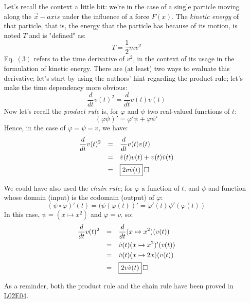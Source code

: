 \documentclass[solutions.tex]{subfiles}
\begin{document}
Let's recall the context a little bit: we're in the case of a single
particle moving along the $\vec{x}-axis$ under the influence of a force
$F(x)$. The \textit{kinetic energy} of that particle, that is, the energy
that the particle has because of its motion, is noted $T$ and is "defined"
as:
\[
	T = \frac12mv^2
\]
Eq. $(3)$ refers to the time derivative of $v^2$, in the context of
its usage in the formulation of kinetic energy. There are (at least)
two ways to evaluate this derivative; let's start by using the
authors' hint regarding the product rule; let's make the time
dependency more obvious:
\[
	\frac{d}{dt}v(t)^2 = \frac{d}{dt}v(t)v(t)
\]
Now let's recall the \textit{product rule} is, for $\varphi$ and
$\psi$ two real-valued functions of $t$:
\[
	(\varphi\psi)' = \varphi'\psi + \varphi\psi'
\]
Hence, in the case of $\varphi=\psi=v$, we have:
\begin{equation*} \begin{aligned}
	\frac{d}{dt}v(t)^2 &&=\quad& \frac{d}{dt}v(t)v(t) \\
	~ &&=\quad&\dot{v}(t)v(t)+v(t)\dot{v}(t) \\
	~ &&=\quad&\boxed{2v\dot{v}(t)} \qed
\end{aligned} \end{equation*}
\begin{remark} We could have also used the \textit{chain rule};
for $\varphi$ a function of $t$, and $\psi$ and function whose domain (input)
is the codomain (output) of $\varphi$:
\[
	(\psi\circ\varphi)'(t) = (\psi(\varphi(t))' = \varphi'(t)\psi'(\varphi(t))
\]
In this case, $\psi=(x\mapsto x^2)$ and $\varphi=v$, so:
\begin{equation*} \begin{aligned}
	\frac{d}{dt}v(t)^2 &&=\quad& \frac{d}{dt}(x\mapsto x^2)(v(t)) \\
	~ &&=\quad&\dot{v}(t)(x\mapsto x^2)'(v(t)) \\
	~ &&=\quad&\dot{v}(t)(x\mapsto 2x)(v(t)) \\
	~ &&=\quad&\boxed{2v\dot{v}(t)} \qed
\end{aligned} \end{equation*}
\end{remark}
\begin{remark} As a reminder, both the product rule and the chain rule have
been proved in
\href{https://github.com/mbivert/ttm/blob/master/cm/L02E04.pdf}{L02E04}. \\
\end{remark}
\end{document}
